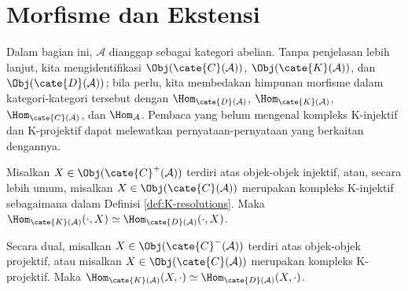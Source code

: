 
\section{Morfisme dan Ekstensi}\label{sec:Hom-Ext}
\hypertarget{o014.aljabr2.chapter4.morphisms-extensions}{ }

Dalam bagian ini, $\mathcal{A}$ dianggap sebagai kategori abelian. Tanpa
penjelasan lebih lanjut, kita mengidentifikasi $\Obj(\cate{C}(\mathcal{A}))$,
$\Obj(\cate{K}(\mathcal{A}))$, dan $\Obj(\cate{D}(\mathcal{A}))$; bila perlu,
kita membedakan himpunan morfisme dalam kategori-kategori tersebut dengan
$\Hom_{\cate{D}(\mathcal{A})}$, $\Hom_{\cate{K}(\mathcal{A})}$,
$\Hom_{\cate{C}(\mathcal{A})}$, dan $\Hom_{\mathcal{A}}$. Pembaca yang belum
mengenal kompleks K-injektif dan K-projektif dapat melewatkan
pernyataan-pernyataan yang berkaitan dengannya.

\begin{proposisi}\label{prop:Hom-D-injective}
	Misalkan $X \in \Obj(\cate{C}^+(\mathcal{A}))$ terdiri atas objek-objek
	injektif, atau, secara lebih umum, misalkan
	$X \in \Obj(\cate{C}(\mathcal{A}))$ merupakan kompleks K-injektif
	sebagaimana dalam Definisi \ref{def:K-resolutions}. Maka
	$\Hom_{\cate{K}(\mathcal{A})}(\cdot, X) \simeq
	\Hom_{\cate{D}(\mathcal{A})}(\cdot, X)$.
	
	Secara dual, misalkan $X \in \Obj(\cate{C}^-(\mathcal{A}))$ terdiri atas
	objek-objek projektif, atau misalkan
	$X \in \Obj(\cate{C}(\mathcal{A}))$ merupakan kompleks K-projektif. Maka
	$\Hom_{\cate{K}(\mathcal{A})}(X, \cdot) \simeq
	\Hom_{\cate{D}(\mathcal{A})}(X, \cdot)$.
\end{proposisi}

